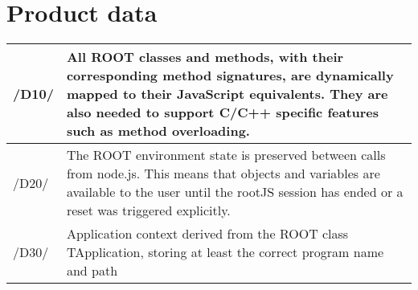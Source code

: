 \chapter{Product data}



\begin{longtable}{|p{1cm} | p{15cm}|}
  \hline
  /D10/ & All ROOT classes and methods, with their corresponding method signatures, are dynamically mapped to their JavaScript equivalents. They are also needed to support C/C++ specific features such as method overloading.\\
  \hline
  /D20/ & The ROOT environment state is preserved between calls from node.js. This means that objects and variables are available to the user until the rootJS session has ended or a reset was triggered explicitly.\\
  \hline
  /D30/ & Application context derived from the ROOT class TApplication, storing at least the correct program name and path \\
  \hline
\end{longtable}
